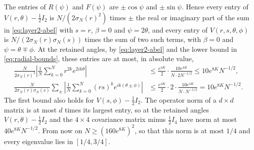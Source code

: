 The entries of $R(\psi)$ and $F(\psi)$ are $\pm\cos\psi$ and
$\pm\sin\psi$. Hence every entry of $V(r,\theta)-\tfrac12I_2$ is
$N/(2\sigma_N(r)^2)$ times $\pm$ the real or imaginary part of the sum in
\eqref{eq:layer2-abel} with $s=r$, $\beta=0$ and $\psi=2\theta$, and every
entry of $V(r,s,\theta,\phi)$ is $N/(2\sigma_N(r)\sigma_N(s))$ times the
sum of two such terms, with $\beta=0$ and $\psi=\theta\mp\phi$.
At the retained angles, by \eqref{eq:layer2-abel} and the lower bound in
\eqref{eq:radial-bounds}, these entries are at most, in absolute value,
\begin{equation}
 \begin{aligned}
 \frac N{2\sigma_N(r)^2}
 \left|\frac1N\sum_{k=0}^Nr^{2k}e^{2ik\theta}\right|
 &\le\frac{e^{4K}}2\cdot\frac{10e^{4K}}{N\cdot2N^{-1/2}}
 \le10e^{8K}N^{-1/2},\\
 \frac N{2\sigma_N(r)\sigma_N(s)}\sum_{\pm}
 \left|\frac1N\sum_{k=0}^N(rs)^ke^{ik(\theta\pm\phi)}\right|
 &\le\frac{e^{4K}}2\cdot2\cdot\frac{10e^{4K}}{N\cdot N^{-1/2}}
 =10e^{8K}N^{-1/2}.
 \end{aligned}\label{eq:covariance-entries}
\end{equation}
The first bound also holds for $V(s,\phi)-\tfrac12I_2$. The operator
norm of a $d\times d$ matrix is at most $d$ times its largest entry, so
at the retained angles $V(r,\theta)-\tfrac12I_2$ and the $4\times4$
covariance matrix minus $\tfrac12I_4$ have norm at most
$40e^{8K}N^{-1/2}$. From now on $N\ge(160e^{8K})^2$, so that this norm is
at most $1/4$ and every eigenvalue lies in $[1/4,3/4]$.

